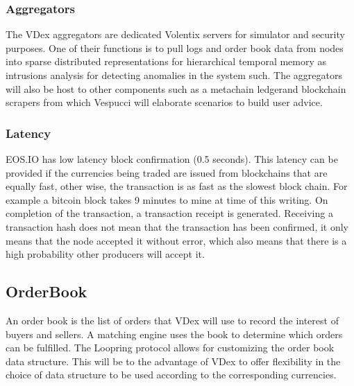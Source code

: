 \documentclass[]{article}
\begin{document}
	\subsubsection{Aggregators}
	
	The VDex aggregators are dedicated Volentix servers for simulator and security purposes. 
	One of their functions is to pull logs and order book data from nodes into sparse distributed representations for hierarchical temporal memory as intrusions \cite{24} analysis for detecting anomalies in the system such. The aggregators will also be host to other components such as a metachain ledger\cite{20}and blockchain scrapers from which Vespucci will elaborate scenarios to build user advice.
	


	\subsubsection{Latency}	
	EOS.IO has low latency block confirmation (0.5 seconds).\cite{3}
	This latency can be provided if the currencies being traded are issued from blockchains that are equally fast, other wise, the transaction is as fast as the slowest block chain.
	For example a bitcoin block takes 9 minutes to mine at time of this writing. On completion of the transaction, a transaction receipt is generated. Receiving a transaction hash does not mean that the transaction has been confirmed, it only means that the node accepted it without error, which also means that there is a high probability other producers will accept it. 

\subsection{OrderBook}
An order book is the list of orders that VDex will use to record the interest of buyers and sellers. A matching engine uses the book to determine which orders can be fulfilled.
The Loopring protocol allows for customizing the order book data structure. \cite{7} This will be to the advantage of VDex to offer flexibility in the choice of data structure to be used according to the corresponding currencies.   
\end{document}
